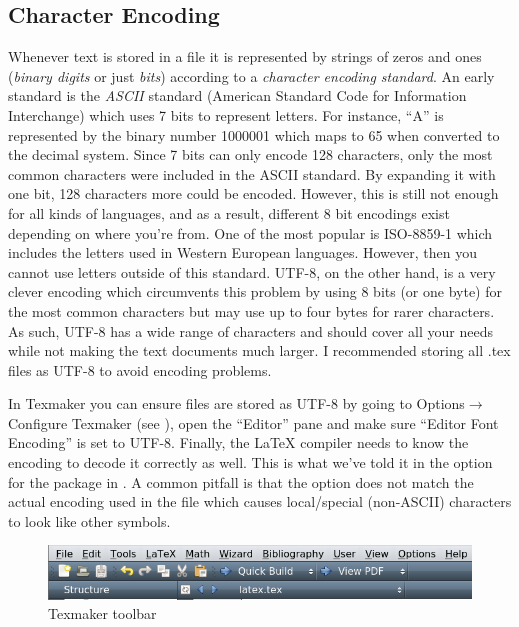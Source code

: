 \subsection{Character Encoding}
Whenever text is stored in a file it is represented by strings of zeros and ones (\emph{binary digits} or just \emph{bits}) according to a \emph{character encoding standard}. An early standard is the \emph{ASCII} standard (American Standard Code for Information Interchange) which uses 7 bits to represent letters. For instance, ``A'' is represented by the binary number 1000001 which maps to 65 when converted to the decimal system. Since 7 bits can only encode 128 characters, only the most common characters were included in the ASCII standard. By expanding it with one bit, 128 characters more could be encoded. However, this is still not enough for all kinds of languages, and as a result, different 8 bit encodings exist depending on where you're from. One of the most popular is ISO-8859-1 which includes the letters used in Western European languages. However, then you cannot use letters outside of this standard. UTF-8, on the other hand, is a very clever encoding which circumvents this problem by using 8 bits (or one byte) for the most common characters but may use up to four bytes for rarer characters. As such, UTF-8 has a wide range of characters and should cover all your needs while not making the text documents much larger. I recommended storing all .tex files as UTF-8 to avoid encoding problems.

In Texmaker you can ensure files are stored as UTF-8 by going to Options$\rightarrow$ Configure Texmaker (see ), open the ``Editor'' pane and make sure ``Editor Font Encoding'' is set to UTF-8. Finally, the \LaTeX{} compiler needs to know the encoding to decode it correctly as well. This is what we've told it in the option for the  package in . A common pitfall is that the  option does not match the actual encoding used in the file which causes local/special (non-ASCII) characters to look like other symbols.

\begin{figure}
	\centering
	\includegraphics[width=\textwidth]{graphics/texmaker.png}
	\caption{Texmaker toolbar}
	\label{fig:latex:texmaker}
\end{figure}

